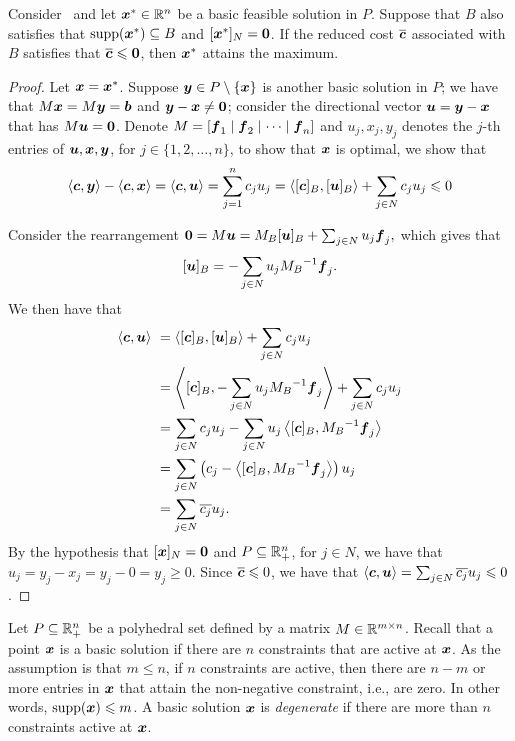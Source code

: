 \begin{theorem}\label{thm: reduced cost to optimal}
Consider \LPSA~and let ${\boldsymbol x}^\ast\in\mathbb R^n$ be a basic feasible solution in $P$. Suppose that $B$ also satisfies that $\operatorname{supp}({\boldsymbol x}^\ast) \subseteq B$ and $[{\boldsymbol x}^\ast]_N = \boldsymbol0 $. If the reduced cost $\overline{{\boldsymbol c}}$ associated with $B$ satisfies that  $\overline{{\boldsymbol c}} \leqslant \boldsymbol0$, then ${\boldsymbol x}^\ast$ attains the maximum. 
\end{theorem}
\begin{proof}
Let ${\boldsymbol x} = {\boldsymbol x}^\ast$. Suppose ${\boldsymbol y} \in P\setminus\{{\boldsymbol x}\}$ is another basic solution in $P$; we have that $M {\boldsymbol x} = M {\boldsymbol y} = {\boldsymbol b}$ and ${\boldsymbol y} - {\boldsymbol x} \neq \boldsymbol 0$; consider the directional vector ${\boldsymbol u} = {\boldsymbol y} - {\boldsymbol x}$ that has $M{\boldsymbol u} = \boldsymbol0$. Denote $M = [{\boldsymbol f}_1\mid {\boldsymbol f}_2 \mid \dots \mid {\boldsymbol f}_n]$ and $u_j, x_j, y_j$ denotes the $j$-th entries of ${\boldsymbol u}, {\boldsymbol x}, {\boldsymbol y}$, for $j\in\{1, 2, \dots, n\}$, to show that ${\boldsymbol x}$ is optimal, we show that 
\[ \left\langle{\boldsymbol c}, {\boldsymbol y}\right\rangle - \left\langle{\boldsymbol c}, {\boldsymbol x}\right\rangle = \left\langle{\boldsymbol c}, {\boldsymbol u}\right\rangle = \sum_{j = 1}^n c_j u_j = \left\langle[{\boldsymbol c}]_B, [{\boldsymbol u}]_B\right\rangle + \sum_{j \in N} c_j u_j \leqslant 0 \]

Consider the rearrangement $ \boldsymbol 0 = M {\boldsymbol u} = M_B [{\boldsymbol u}]_B  + \sum_{j \in N} u_j {\boldsymbol f}_j, $ which gives that 
\[[{\boldsymbol u}]_B  =  -  \sum_{j \in N} u_j {M_B}^{-1}  {\boldsymbol f}_j. \]
We then have that 
\begin{equation*}\begin{split}
 \left\langle{\boldsymbol c}, {\boldsymbol u}\right\rangle~ & = \left\langle[{\boldsymbol c}]_B, [{\boldsymbol u}]_B\right\rangle + \sum_{j \in N} c_j u_j  \\
 & = \left\langle[{\boldsymbol c}]_B, -  \sum_{j \in N} u_j {M_B}^{-1}  {\boldsymbol f}_j\right\rangle + \sum_{j \in N} c_j u_j  \\ 
 & = \sum_{j \in N} c_j u_j -  \sum_{j \in N} u_j \left\langle[{\boldsymbol c}]_B, {M_B}^{-1}  {\boldsymbol f}_j\right\rangle \\ 
 & = \sum_{j \in N} \left( c_j  -  \left\langle[{\boldsymbol c}]_B, {M_B}^{-1}  {\boldsymbol f}_j\right\rangle \right) u_j \\  
 & = \sum_{j \in N} \overline{c_j} u_j. 
\end{split}\end{equation*}
By the hypothesis that $[{\boldsymbol x}]_N = \boldsymbol0$ and $P \subseteq \mathbb R^n_+$, for $j\in N$, we have that $u_j = y_j - x_j = y_j - 0 = y_j \geq 0$. Since $\overline{{\boldsymbol c}}\leqslant 0$, we have that $ \left\langle{\boldsymbol c}, {\boldsymbol u}\right\rangle = \sum_{j \in N} \overline{c_j} u_j  \leqslant 0$. 
\end{proof}

Let $P\subseteq \mathbb R^n_+$ be a polyhedral set defined by a matrix $M \in \mathbb R^{m\times n}$. Recall that a point ${\boldsymbol x}$ is a basic solution if there are $n$ constraints that are active at ${\boldsymbol x}$. As the assumption is that $m\leq n$, if $n$ constraints are active, then there are $n - m$ or more entries in ${\boldsymbol x}$ that attain the non-negative constraint, i.e., are zero. In other words, $\operatorname{supp}({\boldsymbol x}) \leqslant m$. A basic solution ${\boldsymbol x}$ is {\em degenerate} if there are more than $n$ constraints active at ${\boldsymbol x}$.

